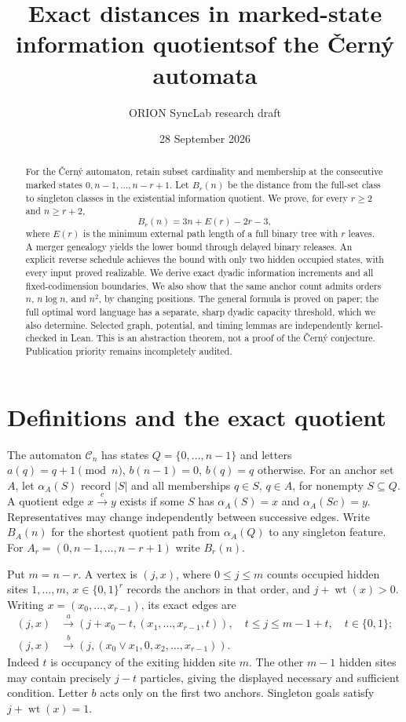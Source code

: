 \documentclass[11pt]{article}
\title{Exact distances in marked-state information quotients\newline of the \v{C}ern\'{y} automata}
\author{ORION SyncLab research draft}
\date{28 September 2026}
\newcommand{\C}{\mathcal C}
\newcommand{\bits}{\{0,1\}}
\newcommand{\wt}{\operatorname{wt}}
\begin{document}
\maketitle
\begin{abstract}
For the \v{C}ern\'{y} automaton, retain subset cardinality and membership at
the consecutive marked states $0,n-1,\ldots,n-r+1$. Let $B_r(n)$ be the
distance from the full-set class to singleton classes in the existential
information quotient. We prove, for every $r\ge2$ and $n\ge r+2$,
\[
B_r(n)=3n+E(r)-2r-3,
\]
where $E(r)$ is the minimum external path length of a full binary tree with
$r$ leaves. A merger genealogy yields the lower bound through delayed
binary releases. An explicit reverse schedule achieves the bound with only
two hidden occupied states, with every input proved realizable. We derive
exact dyadic information increments and all fixed-codimension boundaries.
We also show that the same anchor count admits orders $n$, $n\log n$, and
$n^2$, by changing positions. The general formula is proved on paper;
the full optimal word language has a separate, sharp dyadic capacity
threshold, which we also determine.
Selected graph, potential, and timing lemmas are independently kernel-checked
in Lean. This is an abstraction theorem, not a proof of the \v{C}ern\'{y}
conjecture. Publication priority remains incompletely audited.
\end{abstract}

\section{Definitions and the exact quotient}
The automaton $\C_n$ has states $Q=\{0,\ldots,n-1\}$ and letters
$a(q)=q+1\pmod n$, $b(n-1)=0$, $b(q)=q$ otherwise. For an anchor set $A$,
let $\alpha_A(S)$ record $|S|$ and all memberships $q\in S$, $q\in A$,
for nonempty $S\subseteq Q$. A quotient edge $x\xrightarrow{c}y$ exists
if some $S$ has $\alpha_A(S)=x$ and $\alpha_A(Sc)=y$. Representatives may
change independently between successive edges. Write $B_A(n)$ for the
shortest quotient path from $\alpha_A(Q)$ to any singleton feature.
For $A_r=(0,n-1,\ldots,n-r+1)$ write $B_r(n)$.

Put $m=n-r$. A vertex is $(j,x)$, where $0\le j\le m$ counts occupied
hidden sites $1,\ldots,m$, $x\in\bits^r$ records the anchors in that order,
and $j+\wt(x)>0$. Writing $x=(x_0,\ldots,x_{r-1})$, its exact edges are
\begin{align}
(j,x)&\xrightarrow a
(j+x_0-t,(x_1,\ldots,x_{r-1},t)),
\quad t\le j\le m-1+t,\quad t\in\bits;\label{eq:a}\\
(j,x)&\xrightarrow b (j,(x_0\vee x_1,0,x_2,\ldots,x_{r-1})).\label{eq:b}
\end{align}
Indeed $t$ is occupancy of the exiting hidden site $m$. The other $m-1$
hidden sites may contain precisely $j-t$ particles, giving the displayed
necessary and sufficient condition. Letter $b$ acts only on the first two
anchors. Singleton goals satisfy $j+\wt(x)=1$.
\end{document}
